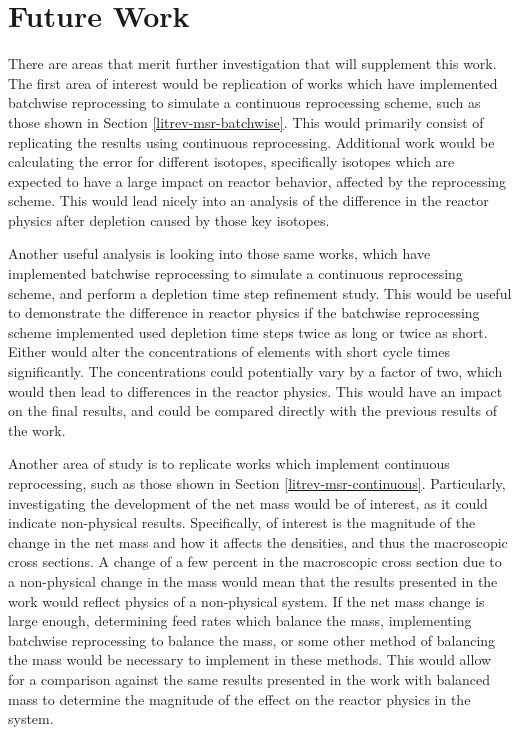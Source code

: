 \section{Future Work}

There are areas that merit further investigation that will supplement this work.
The first area of interest would be replication of works which have implemented batchwise reprocessing to simulate a continuous reprocessing scheme, such as those shown in Section \ref{litrev-msr-batchwise}.
This would primarily consist of replicating the results using continuous reprocessing.
Additional work would be calculating the error for different isotopes, specifically isotopes which are expected to have a large impact on reactor behavior, affected by the reprocessing scheme.
This would lead nicely into an analysis of the difference in the reactor physics after depletion caused by those key isotopes.

Another useful analysis is looking into those same works, which have implemented batchwise reprocessing to simulate a continuous reprocessing scheme, and perform a depletion time step refinement study.
This would be useful to demonstrate the difference in reactor physics if the batchwise reprocessing scheme implemented used depletion time steps twice as long or twice as short.
Either would alter the concentrations of elements with short cycle times significantly.
The concentrations could potentially vary by a factor of two, which would then lead to differences in the reactor physics.
This would have an impact on the final results, and could be compared directly with the previous results of the work.

Another area of study is to replicate works which implement continuous reprocessing, such as those shown in Section \ref{litrev-msr-continuous}.
Particularly, investigating the development of the net mass would be of interest, as it could indicate non-physical results.
Specifically, of interest is the magnitude of the change in the net mass and how it affects the densities, and thus the macroscopic cross sections.
A change of a few percent in the macroscopic cross section due to a non-physical change in the mass would mean that the results presented in the work would reflect physics of a non-physical system.
If the net mass change is large enough, determining feed rates which balance the mass, implementing batchwise reprocessing to balance the mass, or some other method of balancing the mass would be necessary to implement in these methods.
This would allow for a comparison against the same results presented in the work with balanced mass to determine the magnitude of the effect on the reactor physics in the system.

